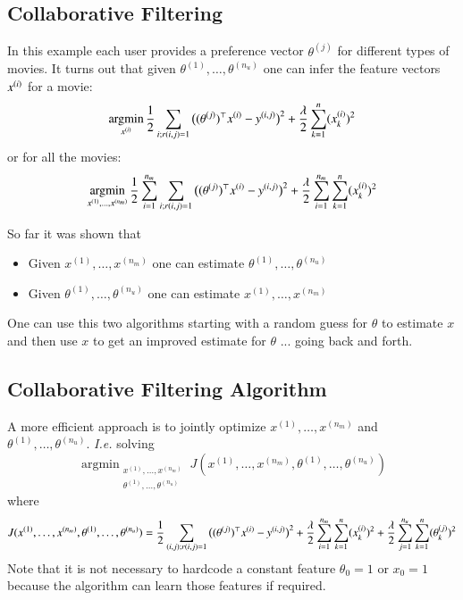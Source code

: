 \documentclass[a4paper,twoside,10pt]{article}
\begin{document}
\subsection{Collaborative Filtering}
In this example each user provides a preference vector $\theta^{(j)}$ for different types of movies.
It turns out that given $\theta^{(1)},\ldots,\theta^{(n_u)}$ one can infer the feature vectors $x^{(i)}$ for a movie:
\begin{equation*}
  \mathop{\operatorname{argmin}}_{x^{(i)}}\frac{1}{2}\sum_{i;r(i,j)=1}\big((\theta^{(j)})^\top x^{(i)}-y^{(i,j)}\big)^2+\frac{\lambda}{2}\sum_{k=1}^n(x^{(i)}_k)^2
\end{equation*}
or for all the movies:
\begin{equation*}
  \mathop{\operatorname{argmin}}_{x^{(1)},\ldots,x^{(n_m)}}\frac{1}{2}\sum_{i=1}^{n_m}\sum_{i;r(i,j)=1}\big((\theta^{(j)})^\top x^{(i)}-y^{(i,j)}\big)^2+\frac{\lambda}{2}\sum_{i=1}^{n_m}\sum_{k=1}^n(x^{(i)}_k)^2
\end{equation*}

So far it was shown that
\begin{itemize}
  \item Given $x^{(1)},\ldots,x^{(n_m)}$ one can estimate $\theta^{(1)},\ldots,\theta^{(n_u)}$
  \item Given $\theta^{(1)},\ldots,\theta^{(n_u)}$ one can estimate $x^{(1)},\ldots,x^{(n_m)}$
\end{itemize}
One can use this two algorithms starting with a random guess for $\theta$ to estimate $x$ and then use $x$ to get an improved estimate for $\theta$ ... going back and forth.

\subsection{Collaborative Filtering Algorithm}
A more efficient approach is to jointly optimize $x^{(1)},\ldots,x^{(n_m)}$ and $\theta^{(1)},\ldots,\theta^{(n_u)}$.
\emph{I.e.} solving
\begin{equation*}
  \mathop{\operatorname{argmin}}_{\substack{x^{(1)},\ldots,x^{(n_m)}\\\theta^{(1)},\ldots,\theta^{(n_u)}}}
  J(x^{(1)},\ldots,x^{(n_m)},\theta^{(1)},\ldots,\theta^{(n_u)})
\end{equation*}
where
\begin{equation}\label{equ:collaborative}
  J(x^{(1)},\ldots,x^{(n_m)},\theta^{(1)},\ldots,\theta^{(n_u)})=
  \frac{1}{2}\sum_{(i,j);r(i,j)=1}\big((\theta^{(j)})^\top x^{(i)}-y^{(i,j)}\big)^2
  +\frac{\lambda}{2}\sum_{i=1}^{n_m}\sum_{k=1}^n(x^{(i)}_k)^2
  +\frac{\lambda}{2}\sum_{j=1}^{n_u}\sum_{k=1}^n(\theta^{(j)}_k)^2
\end{equation}
Note that it is not necessary to hardcode a constant feature $\theta_0=1$ or $x_0=1$ because the algorithm can learn those features if required.
\end{document}
